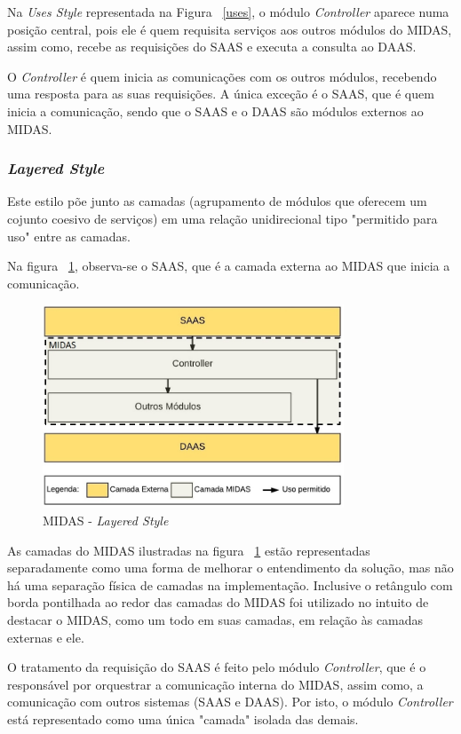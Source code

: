 \documentclass[11pt,a4paper]{article}
\begin{document}
Na \textit{Uses Style} representada na Figura ~\ref{uses}, o módulo \textit{Controller} aparece numa posição central, pois ele é quem requisita serviços aos outros módulos do MIDAS, assim como, recebe as requisições do SAAS e executa a consulta ao DAAS. 

O \textit{Controller} é quem inicia as comunicações com os outros módulos, recebendo uma resposta para as suas requisições. A única exceção é o SAAS, que é quem inicia a comunicação, sendo que o SAAS e o DAAS são módulos externos ao MIDAS. 

\subsubsection{\textit{Layered Style}}

Este estilo põe junto as camadas (agrupamento de módulos que oferecem um cojunto coesivo de serviços) em uma relação unidirecional tipo "permitido para uso" entre as camadas.

Na figura ~\ref{camadas}, observa-se o SAAS, que é a camada externa ao MIDAS que inicia a comunicação. 

\begin{figure} [h!]
  \centering
    \includegraphics[width=0.8\textwidth]{MIDAS_-_Estilo_Camada}
  \caption{MIDAS - \textit{Layered Style}}
  \label{camadas}
\end{figure}

As camadas do MIDAS ilustradas na figura ~\ref{camadas} estão representadas separadamente como uma forma de melhorar o entendimento da solução, mas não há uma separação física de camadas na implementação. Inclusive o retângulo com borda pontilhada ao redor das camadas do MIDAS foi utilizado no intuito de destacar o MIDAS, como um todo em suas camadas, em relação às camadas externas e ele.

O tratamento da requisição do SAAS é feito pelo módulo \textit{Controller}, que é o responsável por orquestrar a comunicação interna do MIDAS, assim como, a comunicação com outros sistemas (SAAS e DAAS). Por isto, o módulo \textit{Controller} está representado como uma única "camada" isolada das demais. 
\end{document}
